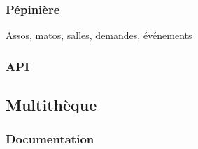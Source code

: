 \subsubsection{Pépinière}

Assos, matos, salles, demandes, événements

\subsubsection{API}

\subsection{Multithèque}

\subsubsection{Documentation}
